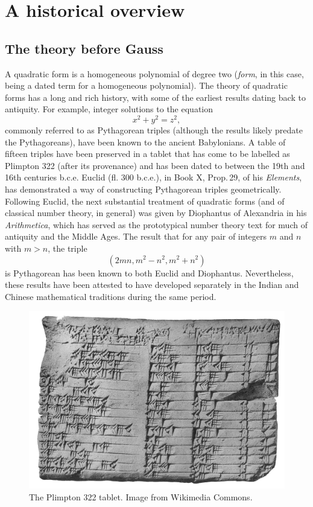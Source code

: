 
\chapter{A historical overview}
\label{chap:history}

\section{The theory before Gauss}

A quadratic form is a homogeneous polynomial of degree two (\emph{form}, in this case, being a dated term for a homogeneous polynomial). The theory of quadratic forms has a long and rich history, with some of the earliest results dating back to antiquity. For example, integer solutions to the equation
\[
    x^2 + y^2 = z^2,
\]
commonly referred to as Pythagorean triples (although the results likely predate the Pythagoreans), have been known to the ancient Babylonians. A table of fifteen triples have been preserved in a tablet that has come to be labelled as Plimpton 322 (after its provenance) and has been dated to between the 19th and 16th centuries {\sc b.c.e.} \cite{robson2002words} Euclid (fl. 300 {\sc b.c.e.}), in Book X, Prop.\,29, of his \emph{Elements}, has demonstrated a way of constructing Pythagorean triples geometrically.\,\cite{euclid1956elements} Following Euclid, the next substantial treatment of quadratic forms (and of classical number theory, in general) was given by Diophantus of Alexandria in his \emph{Arithmetica}, which has served as the prototypical number theory text for much of antiquity and the Middle Ages. \cite{katz2009history} The result that for any pair of integers \(m\) and \(n\) with \(m > n\), the triple
\[
    (2mn, m^2 - n^2, m^2 + n^2)
\]
is Pythagorean has been known to both Euclid and Diophantus. Nevertheless, these results have been attested to have developed separately in the Indian and Chinese mathematical traditions during the same period. \cite{weil1984number}


\begin{figure}
    \centering
    \includegraphics[width=\textwidth]{assets/Plimpton_322.jpg}
    \caption[The Plimpton 322 tablet.]{The Plimpton 322 tablet. Image from Wikimedia Commons.}
    \label{fig:plimpton-322}
\end{figure}

